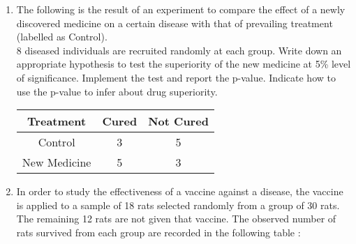 \documentclass[11pt, a4paper]{article}
\begin{document}
\begin{enumerate}

\item The following is the result of an experiment to compare the effect of a newly discovered medicine on 
a certain disease with that of prevailing treatment (labelled as Control). \\

8 diseased individuals are recruited randomly at each group. Write down an appropriate hypothesis to test 
the superiority of the new medicine at 5\% level of significance. Implement the test and report the p-value. 
Indicate how to use the p-value to infer about drug superiority. 


\begin{table}[h]
\def\arraystretch{1.5}

\begin{center}
\begin{tabular}{|c|c|c|}

\hline

Treatment & Cured & Not Cured \\

\hline

Control & 3 & 5 \\

\hline

New Medicine & 5 & 3 \\

\hline


\end{tabular}
\end{center}

\end{table}
















\item In order to study the effectiveness of a vaccine against a disease, the vaccine is applied to a sample of 18 rats selected randomly from a group of 30 rats. The remaining 12 rats are not given that vaccine. The observed number of rats survived from each group are recorded in the following table :

	\begin{table}[h]
	\def\arraystretch{1.5}
	
	\begin{center}
	\begin{tabular}{|c|c|c|}
	

\end{tabular}
\end{center}
\end{table}
\end{enumerate}
\end{document}
